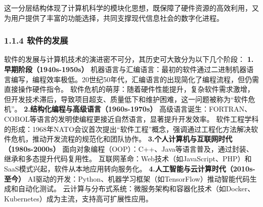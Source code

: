 这一分层结构体现了计算机科学的模块化思想，既保障了硬件资源的高效利用，又为用户提供了丰富的功能选择，共同支撑现代信息社会的数字化进程。 \subsubsection{1.1.4
软件的发展}\label{ux8f6fux4ef6ux7684ux53d1ux5c55} 软件的发展与计算机技术的演进密不可分，其历史可大致分为以下几个阶段： \textbf{1.早期阶段（1940s-1950s）}
机器语言与汇编语言：最初的软件通过二进制机器语言编写，编程效率极低。20世纪50年代，汇编语言的出现简化了编程流程，但仍需直接操作硬件指令。
软件危机的萌芽：随着硬件性能提升，复杂软件需求激增，但开发技术滞后，导致项目超支、质量低下和维护困难，这一问题被称为``软件危机''。 \textbf{2.结构化编程与高级语言（1960s-1970s）}
高级语言诞生：FORTRAN、COBOL等语言的发明使编程更接近自然语言，显著提升开发效率。 软件工程学科的形成：1968年NATO会议首次提出``软件工程''概念，强调通过工程化方法解决软件危机，推动开发流程的规范化和团队协作。
\textbf{3.个人计算机与互联网时代（1980s-2000s）} 面向对象编程（OOP）：C++、Java等语言普及，通过封装、继承和多态提升代码复用性。
互联网革命：Web技术（如JavaScript、PHP）和SaaS模式兴起，软件从本地应用转向服务化。 \textbf{4.人工智能与云计算时代（2010s-至今）}
AI驱动的开发：Python、机器学习框架（如TensorFlow）推动智能代码生成和自动化测试。 云计算与分布式系统：微服务架构和容器化技术（如Docker、Kubernetes）成为主流，支持高可扩展性应用。
